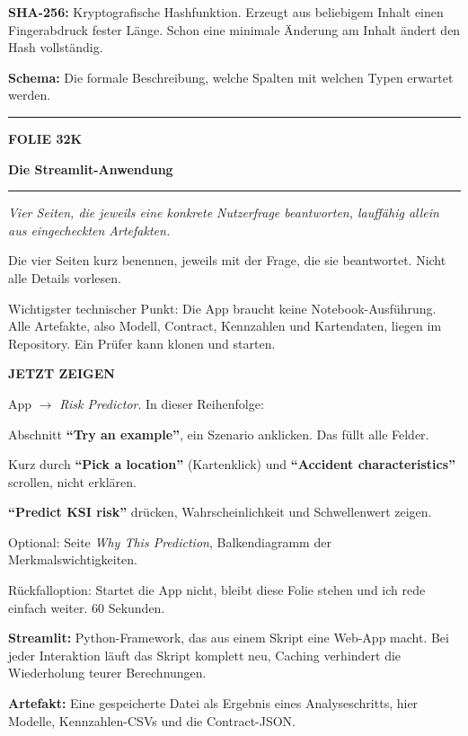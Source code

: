 \documentclass[9pt]{extarticle}
\newcommand{\karte}[3]{%
  \clearpage
  {\color{Accent}\rule{\linewidth}{2.4pt}}\par\vspace{2.5pt}
  {\fontsize{8}{9}\selectfont\bfseries\color{Accent}%
   FOLIE #1\hspace{1.2em}\textbar\hspace{1.2em}#2}\par\vspace{1pt}
  {\fontsize{16}{18}\selectfont\bfseries\color{AccentDark}#3}\par\vspace{3pt}
  {\color{Accent!45}\rule{\linewidth}{0.5pt}}\par\vspace{4pt}%
}
\newcommand{\rubrik}[1]{%
  \vspace{3.5pt}{\fontsize{7.5}{8.5}\selectfont\bfseries\color{Grau}%
  \MakeUppercase{#1}}\par\vspace{1.5pt}}
\newcommand{\kernsatz}[1]{%
  \begin{tcolorbox}[enhanced,sharp corners,boxrule=0pt,
    leftrule=2.2pt,colframe=Accent,colback=AccentPale,
    left=5pt,right=5pt,top=3.5pt,bottom=3.5pt,before skip=1pt,after skip=2pt]
    \color{AccentDark}\itshape #1
  \end{tcolorbox}}
\newcommand{\zeigen}[1]{%
  \begin{tcolorbox}[enhanced,sharp corners,boxrule=0pt,
    leftrule=2.2pt,colframe=Demo,colback=DemoPale,
    left=5pt,right=5pt,top=3.5pt,bottom=3.5pt,before skip=3pt,after skip=2pt]
    {\fontsize{7.5}{8.5}\selectfont\bfseries\color{Demo}JETZT ZEIGEN}\par\vspace{2pt}
    #1
  \end{tcolorbox}}
\newcommand{\bg}[2]{\item \textbf{#1:} #2}
\begin{document}
\rubrik{Begriffe}
\begin{begriff}
  \bg{SHA-256}{Kryptografische Hashfunktion. Erzeugt aus beliebigem Inhalt einen Fingerabdruck
      fester Länge. Schon eine minimale Änderung am Inhalt ändert den Hash vollständig.}
  \bg{Schema}{Die formale Beschreibung, welche Spalten mit welchen Typen erwartet werden.}
\end{begriff}

\karte{32}{K}{Die Streamlit-Anwendung}

\kernsatz{Vier Seiten, die jeweils eine konkrete Nutzerfrage beantworten, lauffähig allein aus
eingecheckten Artefakten.}

\rubrik{Sagen}
\begin{sag}
  \item Die vier Seiten kurz benennen, jeweils mit der Frage, die sie beantwortet. Nicht alle
        Details vorlesen.
  \item Wichtigster technischer Punkt: Die App braucht keine Notebook-Ausführung. Alle Artefakte,
        also Modell, Contract, Kennzahlen und Kartendaten, liegen im Repository. Ein Prüfer kann
        klonen und starten.
\end{sag}

\zeigen{App $\rightarrow$ \textit{Risk Predictor}. In dieser Reihenfolge:
\begin{sag}[itemsep=0.9pt]
  \item Abschnitt \textbf{\enquote{Try an example}}, ein Szenario anklicken. Das füllt alle Felder.
  \item Kurz durch \textbf{\enquote{Pick a location}} (Kartenklick) und
        \textbf{\enquote{Accident characteristics}} scrollen, nicht erklären.
  \item \textbf{\enquote{Predict KSI risk}} drücken, Wahrscheinlichkeit und Schwellenwert zeigen.
  \item Optional: Seite \textit{Why This Prediction}, Balkendiagramm der Merkmalswichtigkeiten.
\end{sag}
Rückfalloption: Startet die App nicht, bleibt diese Folie stehen und ich rede einfach weiter.
60 Sekunden.}

\rubrik{Begriffe}
\begin{begriff}
  \bg{Streamlit}{Python-Framework, das aus einem Skript eine Web-App macht. Bei jeder Interaktion
      läuft das Skript komplett neu, Caching verhindert die Wiederholung teurer Berechnungen.}
  \bg{Artefakt}{Eine gespeicherte Datei als Ergebnis eines Analyseschritts, hier Modelle,
      Kennzahlen-CSVs und die Contract-JSON.}
\end{begriff}
\end{document}
